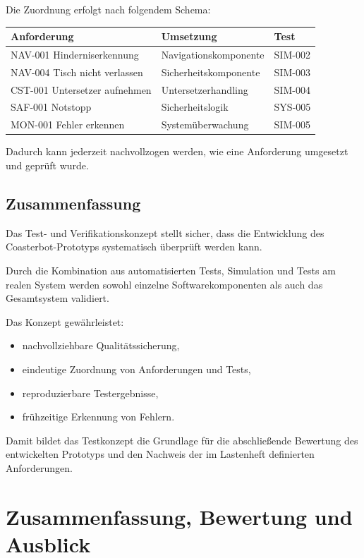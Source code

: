 Die Zuordnung erfolgt nach folgendem Schema:

\begin{longtable}[]{@{}lll@{}}
\toprule\noalign{}
Anforderung & Umsetzung & Test \\
\midrule\noalign{}
\endhead
\bottomrule\noalign{}
\endlastfoot
NAV-001 Hinderniserkennung & Navigationskomponente & SIM-002 \\
NAV-004 Tisch nicht verlassen & Sicherheitskomponente & SIM-003 \\
CST-001 Untersetzer aufnehmen & Untersetzerhandling & SIM-004 \\
SAF-001 Notstopp & Sicherheitslogik & SYS-005 \\
MON-001 Fehler erkennen & Systemüberwachung & SIM-005 \\
\end{longtable}

Dadurch kann jederzeit nachvollzogen werden, wie eine Anforderung
umgesetzt und geprüft wurde.

\subsection{Zusammenfassung}\label{zusammenfassung-5}

Das Test- und Verifikationskonzept stellt sicher, dass die Entwicklung
des Coasterbot-Prototyps systematisch überprüft werden kann.

Durch die Kombination aus automatisierten Tests, Simulation und Tests am
realen System werden sowohl einzelne Softwarekomponenten als auch das
Gesamtsystem validiert.

Das Konzept gewährleistet:

\begin{itemize}
\tightlist
\item
  nachvollziehbare Qualitätssicherung,
\item
  eindeutige Zuordnung von Anforderungen und Tests,
\item
  reproduzierbare Testergebnisse,
\item
  frühzeitige Erkennung von Fehlern.
\end{itemize}

Damit bildet das Testkonzept die Grundlage für die abschließende
Bewertung des entwickelten Prototyps und den Nachweis der im Lastenheft
definierten Anforderungen.

\section{Zusammenfassung, Bewertung und
Ausblick}\label{zusammenfassung-bewertung-und-ausblick}

